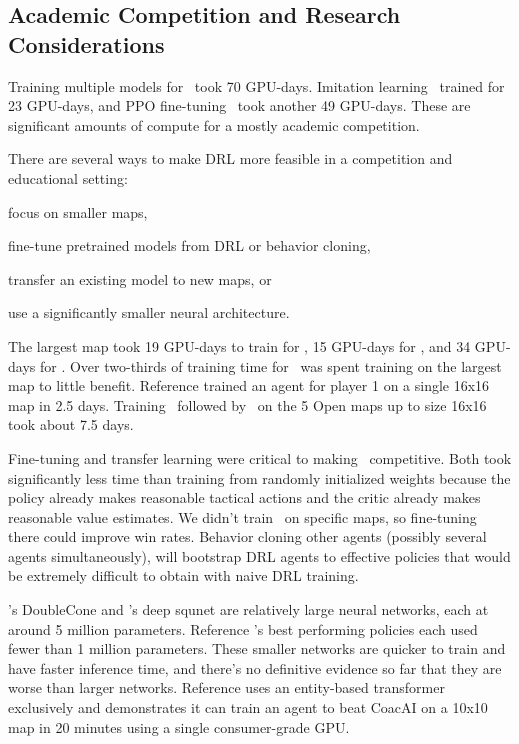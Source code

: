 \documentclass[conference]{IEEEtran}
\begin{document}
\subsection{Academic Competition and Research Considerations}
Training multiple models for \agentName\ took 70 GPU-days. Imitation learning \bcAgent\
trained for 23 GPU-days, and PPO fine-tuning \bcPPOAgent\ took another 49 GPU-days. 
These are significant amounts of compute for a mostly academic competition.

There are several ways to make DRL more feasible in a competition and educational setting:
\begin{inparaenum}[(1)]
    \item focus on smaller maps,
    \item fine-tune pretrained models from DRL or behavior cloning,
    \item transfer an existing model to new maps, or
    \item use a significantly smaller neural architecture.
\end{inparaenum}
The largest map took 19 GPU-days to train for \agentName, 15 GPU-days for \bcAgent, and
34 GPU-days for \bcPPOAgent. Over two-thirds of training time for \bcPPOAgent\ was spent
training on the largest map to little benefit. Reference
\cite{DBLP:journals/corr/abs-2105-13807} trained an agent for player 1 on a single 16x16
map in 2.5 days. Training \bcAgent\ followed by \bcPPOAgent\ on the 5 Open maps up to
size 16x16 took about 7.5 days.

Fine-tuning and transfer learning were critical to making \agentName\ competitive. Both
took significantly less time than training from randomly initialized weights because the
policy already makes reasonable tactical actions and the critic already makes reasonable
value estimates. We didn't train
\bcPPOAgent\ on specific maps, so fine-tuning there could improve win rates. Behavior
cloning other agents (possibly several agents simultaneously), will bootstrap DRL agents
to effective policies that would be extremely difficult to obtain with naive DRL
training.

\agentName's DoubleCone and \bcPPOAgent's deep squnet are relatively large neural
networks, each at around 5 million parameters. Reference
\cite{DBLP:journals/corr/abs-2105-13807}'s best performing policies each used fewer
than 1 million parameters. These smaller networks are quicker to train and have faster
inference time, and there's no definitive evidence so far that they are worse than
larger networks. Reference 
\cite{Winter2023} uses an entity-based transformer exclusively and demonstrates
it can train an agent to beat CoacAI on a 10x10 map in 20 minutes using a single
consumer-grade GPU.
\end{document}
